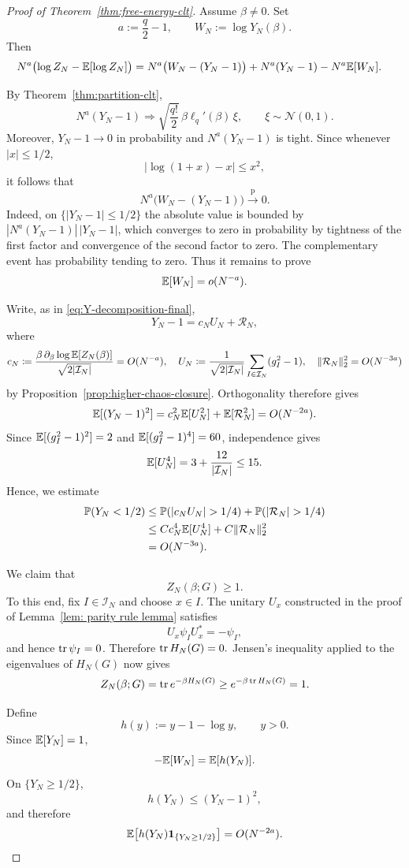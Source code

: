 \documentclass[../CLT_SYK.tex]{subfiles}
\begin{document}
\begin{proof}[Proof of {Theorem~\ref{thm:free-energy-clt}}]
Assume $\beta\neq0$.  Set
\[
a:=\frac q2-1,
\qquad
W_N:=\log Y_N(\beta).
\]
Then
\begin{align*}
N^a\bigl(\log Z_N-\mathbb E[\log Z_N]\bigr)
&=
N^a\bigl(W_N-(Y_N-1)\bigr)
+N^a(Y_N-1)
-N^a\mathbb E[W_N] .
\end{align*}

By Theorem~\ref{thm:partition-clt},
\[
N^a(Y_N-1)
\Longrightarrow
\sqrt{\frac{q!}{2}}\,
\beta\ell_q'(\beta)\,\xi,
\qquad
\xi\sim\mathcal N(0,1).
\]
Moreover, $Y_N-1\to0$ in probability and
$N^a(Y_N-1)$ is tight.  Since whenever $|x|\le1/2$, 
\[
|\log(1+x)-x|\le x^2,
\]
it follows that
\[
N^a\bigl(W_N-(Y_N-1)\bigr)
\xrightarrow{\mathrm p}0.
\]
Indeed, on $\{|Y_N-1|\leq1/2\}$ the absolute value is bounded by
\(
|N^a(Y_N-1)|\,|Y_N-1|
\), which converges to zero in probability by tightness of the first factor
and convergence of the second factor to zero.  The complementary event has
probability tending to zero.
Thus it remains to prove
\[
\mathbb E[W_N]=o(N^{-a}).
\]

Write, as in \eqref{eq:Y-decomposition-final},
\[
Y_N-1=c_NU_N+\mathcal R_N,
\]
where
\[
c_N\coloneqq \frac{\beta\,\partial_\beta\log \mathbb E[Z_N(\beta)]}{\sqrt{2|\mathcal I_N|}}= O(N^{-a}),\quad U_N\coloneqq \frac1{\sqrt{2|\mathcal I_N|}}\sum_{I\in\mathcal I_N}(g_I^2-1)
,\quad
\|\mathcal R_N\|_2^2=O(N^{-3a})
\]
by Proposition~\ref{prop:higher-chaos-closure}. Orthogonality therefore
gives
\[
\mathbb E[(Y_N-1)^2]=c_N^2 \mathbb E[U_N^2] + \mathbb E[\mathcal R_N^2]= O(N^{-2a}).
\]
Since $\mathbb E[(g_I^2-1)^2]=2$ and
$\mathbb E[(g_I^2-1)^4]=60$, independence gives
\[
\mathbb E[U_N^4]=3+\frac{12}{|\mathcal I_N|}\leq15.
\]  
Hence, we estimate
\begin{align*}
\mathbb P(Y_N<1/2)
&\le
\mathbb P(|c_NU_N|>1/4)
+
\mathbb P(|\mathcal R_N|>1/4)\\
&\le
C c_N^4\E[U_N^4]
+
C\|\mathcal R_N\|_2^2\\
&=O(N^{-3a}).
\end{align*}

We claim that 
\[
Z_N(\beta;G)\ge1.
\]
To this end, fix \(I\in\mathcal I_N\) and choose \(x\in I\). 
The unitary $U_x$ {constructed in the proof of}  Lemma~\ref{lem: parity rule lemma} satisfies
\[
U_x\psi_IU_x^*=-\psi_I,
\]
and hence $\operatorname{tr}\psi_I=0$.  Therefore
\(
\operatorname{tr} H_N(G)=0.
\) 
Jensen's inequality applied to the eigenvalues of $H_N(G)$ now gives
\[
Z_N(\beta;G)
=
\operatorname{tr} e^{-\beta H_N(G)}
\ge
e^{-\beta\operatorname{tr} H_N(G)}
=1.
\]

Define
\[
h(y):=y-1-\log y,
\qquad y>0.
\]
Since $\mathbb E[Y_N]=1$,
\[
-\mathbb E[W_N]
=
\mathbb E[h(Y_N)].
\]
On $\{Y_N\ge1/2\}$,
\[
h(Y_N)\le (Y_N-1)^2,
\]
and therefore
\[
\mathbb E\!\left[
h(Y_N)\mathbf 1_{\{Y_N\ge1/2\}}
\right]
=O(N^{-2a}).
\]


\end{proof}
\end{document}

